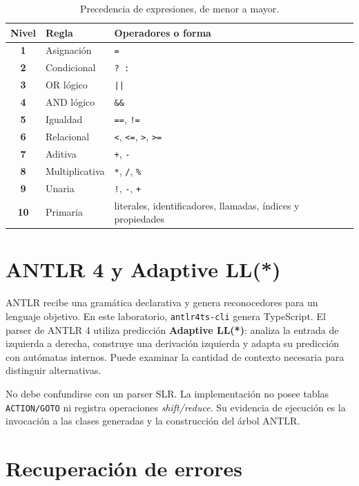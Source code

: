\documentclass[12pt,letterpaper,oneside]{report}
\newcommand{\archivo}[1]{\texttt{#1}}
\begin{document}
\begin{table}[H]
\centering
\caption{Precedencia de expresiones, de menor a mayor.}
\label{tab:precedencia}
\begin{tabularx}{\textwidth}{>{\bfseries}c l X}
\toprule
Nivel & Regla & Operadores o forma \\
\midrule
1 & Asignación & \archivo{=} \\
2 & Condicional & \archivo{? :} \\
3 & OR lógico & \archivo{||} \\
4 & AND lógico & \archivo{\&\&} \\
5 & Igualdad & \archivo{==}, \archivo{!=} \\
6 & Relacional & \archivo{<}, \archivo{<=}, \archivo{>}, \archivo{>=} \\
7 & Aditiva & \archivo{+}, \archivo{-} \\
8 & Multiplicativa & \archivo{*}, \archivo{/}, \archivo{\%} \\
9 & Unaria & \archivo{!}, \archivo{-}, \archivo{+} \\
10 & Primaria & literales, identificadores, llamadas, índices y propiedades \\
\bottomrule
\end{tabularx}
\end{table}

\vspace{10cm}

\section{ANTLR 4 y Adaptive LL(*)}

ANTLR recibe una gramática declarativa y genera reconocedores para un lenguaje
objetivo. En este laboratorio, \archivo{antlr4ts-cli} genera TypeScript. El parser de
ANTLR 4 utiliza predicción \textbf{Adaptive LL(*)}: analiza la entrada de izquierda a
derecha, construye una derivación izquierda y adapta su predicción con autómatas
internos. Puede examinar la cantidad de contexto necesaria para distinguir
alternativas.

No debe confundirse con un parser SLR. La implementación no posee tablas
\archivo{ACTION/GOTO} ni registra operaciones \emph{shift/reduce}. Su evidencia de
ejecución es la invocación a las clases generadas y la construcción del árbol ANTLR.

\section{Recuperación de errores}
\end{document}
